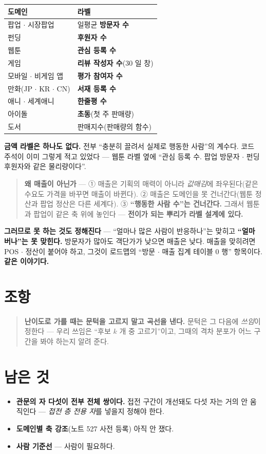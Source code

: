 \documentclass[11pt]{article}
\begin{document}
\begin{center}
\begin{tabular}{ll}
\hline
도메인 & 라벨 \\
\hline
팝업 $\cdot$ 시장팝업 & 일평균 \textbf{방문자 수} \\
펀딩 & \textbf{후원자 수} \\
웹툰 & \textbf{관심 등록 수} \\
게임 & \textbf{리뷰 작성자 수}($30$ 일 창) \\
모바일 $\cdot$ 비게임 앱 & \textbf{평가 참여자 수} \\
만화(JP $\cdot$ KR $\cdot$ CN) & \textbf{서재 등록 수} \\
애니 $\cdot$ 세계애니 & \textbf{한줄평 수} \\
아이돌 & \textbf{초동}(첫 주 판매량) \\
도서 & 판매지수(판매량의 함수) \\
\hline
\end{tabular}
\end{center}

\textbf{금액 라벨은 하나도 없다.} 전부 ``충분히 끌려서 실제로 행동한 사람''의
계수다. 코드 주석이 이미 그렇게 적고 있었다 --- 웹툰 라벨 옆에 ``관심 등록 수.
팝업 방문자 $\cdot$ 펀딩 후원자와 같은 물리량이다''.

\begin{quote}
\textbf{왜 매출이 아닌가} --- ① 매출은 기획의 매력이 아니라 \emph{값매김}에
좌우된다(같은 수요도 가격을 바꾸면 매출이 바뀐다). ② 매출은 도메인을 못
건너간다(웹툰 정산과 팝업 정산은 다른 세계다). ③ \textbf{``행동한 사람 수''는
건너간다.} 그래서 웹툰과 팝업이 같은 축 위에 놓인다 ---
\textbf{전이가 되는 뿌리가 라벨 설계에 있다.}
\end{quote}

\textbf{그러므로 못 하는 것도 정해진다} --- ``얼마나 많은 사람이 반응하나''는
맞히고 \textbf{``얼마 버나''는 못 맞힌다.} 방문자가 많아도 객단가가 낮으면
매출은 낮다. 매출을 맞히려면 POS $\cdot$ 정산이 붙어야 하고, 그것이 로드맵의
``방문 $\cdot$ 매출 집계 테이블 $0$ 행'' 항목이다. \textbf{같은 이야기다.}

\section*{조항}

\begin{quote}
\textbf{난이도로 가를 때는 문턱을 고르지 말고 곡선을 낸다.} 문턱은 그 다음에
\emph{쓰임}이 정한다 --- 우리 쓰임은 ``후보 $k$ 개 중 고르기''이고, 그때의
격차 분포가 어느 구간을 봐야 하는지 알려 준다.
\end{quote}

\section*{남은 것}

\begin{itemize}
\item \textbf{관문의 자 다섯이 전부 전체 쌍이다.} 접전 구간이 개선돼도 다섯 자는
거의 안 움직인다 --- \emph{접전 층 전용 자}를 넣을지 정해야 한다.
\item \textbf{도메인별 축 강조}(노트 527 사전 등록) 아직 안 쟀다.
\item \textbf{사람 기준선} --- 사람이 필요하다.
\end{itemize}
\end{document}
